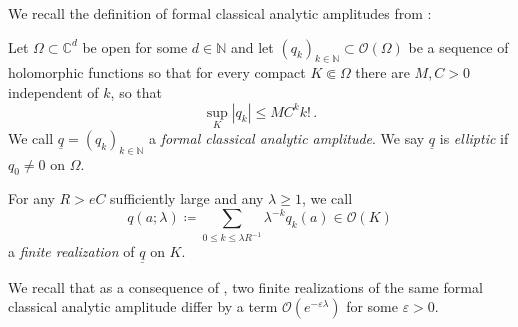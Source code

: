 \documentclass[
	fontsize=11pt, 
	twoside=false, 
	abstract=true, 
	a4paper,
]{scrartcl}
\newcommand{\eps}{\varepsilon}
\newcommand{\CC}{\mathbb{C}}
\newcommand{\abs}[1]{\left\lvert#1\right\rvert}
\newcommand{\ud}[1]{\underline{#1}}
\begin{document}
We recall the definition of formal classical analytic amplitudes from \cite[\S~1]{AST_1982__95__R3_0}:
\begin{definition}\label{def:sjoamp}
	Let $\Omega \subset \CC^{d}$ be open for some $d\in\mathbb{N}$ and let $(q_k)_{k\in\mathbb{N}} \subset \mathcal{O}(\Omega)$ be a sequence of holomorphic functions so that for every compact $K\Subset \Omega$ there are $M, C>0$ independent of $k$, so that 
	\[
		\sup_K \abs{q_k} \leq M C^k k!\,.
	\]
	We call $\ud{q} = (q_k)_{k\in\mathbb{N}}$ a \emph{formal classical analytic amplitude}. We say $\ud{q}$ is \emph{elliptic} if $q_0 \neq 0$ on $\Omega$.

	For any $R>eC$ sufficiently large and any $\lambda\geq 1$, we call 
	\[
		q(a;\lambda) \coloneqq \sum_{0\leq k\leq \lambda R^{-1}} \lambda^{-k}q_k(a) \in \mathcal{O}(K)
	\]
	a \emph{finite realization} of $\ud{q}$ on $K$. 
\end{definition}
We recall that as a consequence of \cite[Ex.~1.1]{AST_1982__95__R3_0}, two finite realizations of the same formal classical analytic amplitude differ by a term $\mathcal{O}(e^{-\eps\lambda})$ for some $\eps>0$.
\end{document}
